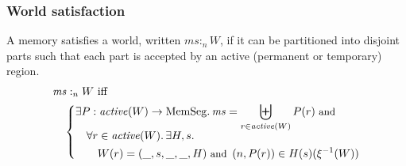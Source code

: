 \documentclass[compsoc,conference,letterpaper,fleqn]{IEEEtran}
\newcommand{\var}[1]{\mathit{#1}}
\newcommand{\hs}{\var{ms}}
\newcommand{\ms}{\hs}
\newcommand{\heap}{\var{mem}}
\newcommand{\plainfun}[2]{
  \ifthenelse{\equal{#2}{}}
  {\mathit{#1}}
  {\mathit{#1}(#2)}
}
\newcommand{\activeReg}[1]{\plainfun{active}{#1}}
\newcommand{\heapSat}[3][\heap]{#1 :_{#2} #3}
\newcommand{\memSat}[3][n]{\heapSat[#2]{#1}{#3}}
\newcommand{\plaindom}[1]{\mathrm{#1}}
\newcommand{\HeapSegments}{\plaindom{MemSeg}}
\newcommand{\npair}[2][n]{\left(#1,#2 \right)}
\begin{document}
\subsubsection{World satisfaction}
A memory satisfies a world, written $\memSat{\ms}{W}$, if it can be partitioned
into disjoint parts such that each part is accepted by an active (permanent or
temporary) region.
\begin{align*}
  &\memSat{\ms}{W}
    \text{ iff }\\
  &\quad \left\{\begin{aligned}
        &\exists P : \activeReg{W} \rightarrow \HeapSegments \ldotp \hs = \biguplus_{r\in\activeReg{W}}P(r) \text{\footnotesize{ and }} \\[-.2cm]
        &\quad \forall r \in \activeReg{W} \ldotp \exists H,s \ldotp\\
        &\qquad W(r) = (\_,s,\_,\_,H) \text{\footnotesize{ and }} \npair[n]{P(r)} \in H(s)(\xi^{-1}(W))\\
      \end{aligned}\right.
\end{align*}
\end{document}
